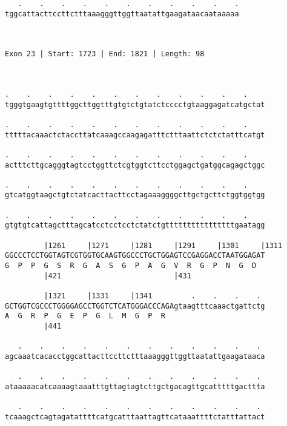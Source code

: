 \documentclass{article}
\begin{document}
\begin{Verbatim}
   .    .    .    .    .    .    .    .    .    .    .
tggcattacttccttctttaaagggttggttaatattgaagataacaataaaaa
                                                      
                                                      
 
Exon 23 | Start: 1723 | End: 1821 | Length: 98



.    .    .    .    .    .    .    .    .    .    .    .    
tgggtgaagtgttttggcttggtttgtgtctgtatctcccctgtaaggagatcatgctat
                                                            
.    .    .    .    .    .    .    .    .    .    .    .    
tttttacaaactctaccttatcaaagccaagagatttctttaattctctctatttcatgt
                                                            
.    .    .    .    .    .    .    .    .    .    .    .    
actttcttgcagggtagtcctggttctcgtggtcttcctggagctgatggcagagctggc
                                                            
.    .    .    .    .    .    .    .    .    .    .    .    
gtcatggtaagctgtctatcacttacttcctagaaaggggcttgctgcttctggtggtgg
                                                            
.    .    .    .    .    .    .    .    .    .    .    .    
gtgtgtcattagctttagcatcctcctcctctatctgttttttttttttttttgaatagg
                                                            
         |1261     |1271     |1281     |1291     |1301     |1311
GGCCCTCCTGGTAGTCGTGGTGCAAGTGGCCCTGCTGGAGTCCGAGGACCTAATGGAGAT
G  P  P  G  S  R  G  A  S  G  P  A  G  V  R  G  P  N  G  D  
         |421                          |431                 
  
         |1321     |1331     |1341         .    .    .    . 
GCTGGTCGCCCTGGGGAGCCTGGTCTCATGGGACCCAGAgtaagtttcaaactgattctg
A  G  R  P  G  E  P  G  L  M  G  P  R                       
         |441                                               
  
   .    .    .    .    .    .    .    .    .    .    .    . 
agcaaatcacacctggcattacttccttctttaaagggttggttaatattgaagataaca
                                                            
   .    .    .    .    .    .    .    .    .    .    .    . 
ataaaaacatcaaaagtaaatttgttagtagtcttgctgacagttgcatttttgacttta
                                                            
   .    .    .    .    .    .    .    .    .    .    .    . 
tcaaagctcagtagatattttcatgcatttaattagttcataaattttctatttattact
                                                            

\end{Verbatim}
\end{document}
